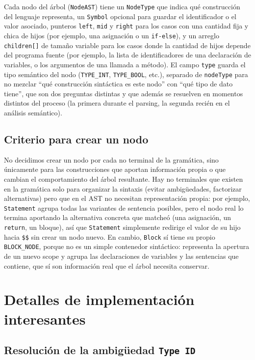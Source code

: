 \documentclass[11pt,a4paper]{article}
\begin{document}
Cada nodo del árbol (\texttt{NodeAST}) tiene un \texttt{NodeType} que indica
qué construcción del lenguaje representa, un \texttt{Symbol} opcional para
guardar el identificador o el valor asociado, punteros \texttt{left},
\texttt{mid} y \texttt{right} para los casos con una cantidad fija y chica de
hijos (por ejemplo, una asignación o un \texttt{if-else}), y un arreglo
\texttt{children[]} de tamaño variable para los casos donde la cantidad de
hijos depende del programa fuente (por ejemplo, la lista de identificadores
de una declaración de variables, o los argumentos de una llamada a método).
El campo \texttt{type} guarda el tipo semántico del nodo (\texttt{TYPE\_INT},
\texttt{TYPE\_BOOL}, etc.), separado de \texttt{nodeType} para no mezclar
``qué construcción sintáctica es este nodo'' con ``qué tipo de dato tiene'', que
son dos preguntas distintas y que además se resuelven en momentos distintos
del proceso (la primera durante el parsing, la segunda recién en el análisis
semántico).

\subsection{Criterio para crear un nodo}

No decidimos crear un nodo por cada no terminal de la gramática, sino
únicamente para las construcciones que aportan información propia o que
cambian el comportamiento del árbol resultante. Hay no terminales que
existen en la gramática solo para organizar la sintaxis (evitar ambigüedades,
factorizar alternativas) pero que en el AST no necesitan representación
propia: por ejemplo, \texttt{Statement} agrupa todas las variantes de
sentencia posibles, pero el nodo real lo termina aportando la alternativa
concreta que matcheó (una asignación, un \texttt{return}, un bloque), así que
\texttt{Statement} simplemente redirige el valor de su hijo hacia
\texttt{\$\$} sin crear un nodo nuevo. En cambio, \texttt{Block} sí tiene su
propio \texttt{BLOCK\_NODE}, porque no es un simple contenedor sintáctico:
representa la apertura de un nuevo scope y agrupa las declaraciones de
variables y las sentencias que contiene, que sí son información real que el
árbol necesita conservar.

\section{Detalles de implementación interesantes}

\subsection{Resolución de la ambigüedad \texttt{Type ID}}
\end{document}
